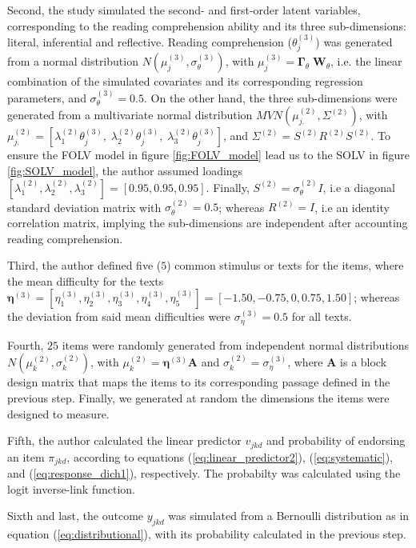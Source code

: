 Second, the study simulated the second- and first-order latent variables, corresponding to the reading comprehension ability and its three sub-dimensions: literal, inferential and reflective. Reading comprehension ($\theta^{(3)}_{j}$) was generated from a normal distribution $N( \mu^{(3)}_{j}, \sigma^{(3)}_{\theta} )$, with $\mu^{(3)}_{j} = \pmb{\Gamma}_{\theta} \; \mathbf{W}_{\theta}$, i.e. the linear combination of the simulated covariates and its corresponding regression parameters, and $\sigma^{(3)}_{\theta}=0.5$. On the other hand, the three sub-dimensions were generated from a multivariate normal distribution $MVN( \mu^{(2)}_{j.} , \Sigma^{(2)})$, with $\mu^{(2)}_{j.} = [\lambda^{(2)}_{1} \theta^{(3)}_{j}, \; \lambda^{(2)}_{2} \theta^{(3)}_{j}, \; \lambda^{(2)}_{3} \theta^{(3)}_{j} ]$, and $\Sigma^{(2)} = S^{(2)} R^{(2)} S^{(2)}$. To ensure the FOLV model in figure \ref{fig:FOLV_model} lead us to the SOLV in figure \ref{fig:SOLV_model}, the author assumed loadings $[\lambda^{(2)}_{1}, \lambda^{(2)}_{2}, \lambda^{(2)}_{3}] = [0.95, 0.95, 0.95]$. Finally, $S^{(2)} = \sigma^{(2)}_{\theta} I$, i.e a diagonal standard deviation matrix with $\sigma^{(2)}_{\theta} = 0.5$; whereas $R^{(2)} = I$, i.e an identity correlation matrix, implying the sub-dimensions are independent after accounting reading comprehension.

Third, the author defined five ($5$) common stimulus or texts for the items, where the mean difficulty for the texts $\pmb{\eta}^{(3)} = [\eta^{(3)}_{1}, \eta^{(3)}_{2}, \eta^{(3)}_{3}, \eta^{(3)}_{4}, \eta^{(3)}_{5}] = [-1.50, -0.75, 0, 0.75, 1.50]$; whereas the deviation from said mean difficulties were $\sigma^{(3)}_{\eta} = 0.5$ for all texts. 

Fourth, $25$ items were randomly generated from independent normal distributions $N( \mu^{(2)}_{k}, \sigma^{(2)}_{k} ) $, with $\mu^{(2)}_{k} = \pmb{\eta}^{(3)} \mathbf{A}$ and $\sigma^{(2)}_{k} = \sigma^{(3)}_{\eta}$, where $\mathbf{A}$ is a block design matrix that maps the items to its corresponding passage defined in the previous step. Finally, we generated at random the dimensions the items were designed to measure.

Fifth, the author calculated the linear predictor $v_{jkd}$ and probability of endorsing an item $\pi_{jkd}$, according to equations (\ref{eq:linear_predictor2}), (\ref{eq:systematic}), and (\ref{eq:response_dich1}), respectively. The probabilty was calculated using the logit inverse-link function.
	
Sixth and last, the outcome $y_{jkd}$ was simulated from a Bernoulli distribution as in equation (\ref{eq:distributional}), with its probability calculated in the previous step.

